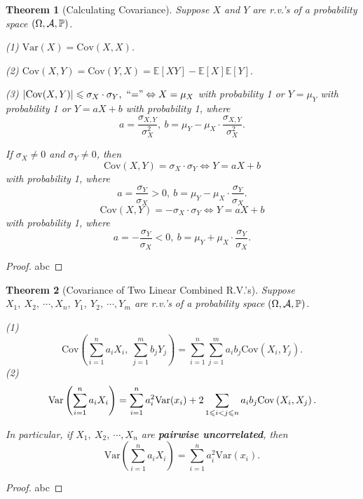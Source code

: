 \documentclass[openany,12pt]{book}
\newtheorem{theorem}{Theorem}[chapter]
\begin{document}
\begin{theorem}[Calculating Covariance]
Suppose $X$ and $Y$ are r.v.'s of a probability space $(\Omega,\mathcal{A},\mathbb{P})$.

(1) $\mathrm{Var}(X) = \mathrm{Cov}(X,X)$.

(2)
$\mathrm{Cov}(X,Y) = \mathrm{Cov}(Y,X) = \mathbb{E}[XY] - \mathbb{E}[X] \mathbb{E}[Y].$

(3)
$\left| \mathrm{Cov}(X,Y) \right| \leqslant \sigma_{X}\cdot \sigma_{Y},\ \text{``=''} \Leftrightarrow X = \mu_{X}$ with probability 1 or
$Y = \mu_{Y}$ with probability 1 or $Y=aX+b$ with probability 1, where
\[a = \frac{\sigma_{X,Y}}{\sigma_{X}^{2}},\ b = \mu_{Y} - \mu_{X} \cdot \frac{\sigma_{X,Y}}{\sigma_{X}^{2}}.\]

If $\sigma_{X} \neq 0$ and $\sigma_{Y} \neq 0$, then
\[\mathrm{Cov}( X,Y)= \sigma_{X}\cdot \sigma_{Y} \Leftrightarrow Y = aX + b\]
with probability 1, where
\[a = \frac{\sigma_{Y}}{\sigma_{X}} > 0,\ b = \mu_{Y} - \mu_{X} \cdot \frac{\sigma_{Y}}{\sigma_{X}}.\]
\[\mathrm{Cov}( X,Y)=- \sigma_{X}\cdot \sigma_{Y} \Leftrightarrow Y = aX + b\]
with probability 1, where
\[a = - \frac{\sigma_{Y}}{\sigma_{X}} < 0,\ b = \mu_{Y} + \mu_{X} \cdot \frac{\sigma_{Y}}{\sigma_{X}}.\]
\end{theorem}

\begin{proof}
  abc
\end{proof}

\begin{theorem}[Covariance of Two Linear Combined R.V.'s]
Suppose $X_{1},\ X_{2},\ \cdots,X_{n},\ Y_{1},\ Y_{2},\ \cdots,Y_{m}$ are r.v.'s of a probability space $(\Omega,\mathcal{A},\mathbb{P})$.

(1)
\[\mathrm{Cov}\left( \sum_{i = 1}^{n}{a_{i}X_{i}},\ \sum_{j = 1}^{m}{b_{j}Y_{j}} \right) = \sum_{i = 1}^{n}{\sum_{j = 1}^{m}a_{i}b_{j}}\mathrm{Cov}\left( X_{i},Y_{j} \right).\]
(2)
\[\mathrm{Var}\left( \sum_{i = 1}^{n}{a_{i}X_{i}} \right) = \sum_{i = 1}^{n}{a_{i}^{2}\mathrm{Var}(x_{i})} + 2\sum_{1 \leqslant i < j \leqslant n}^{}a_{i}b_{j}\mathrm{Cov}\left( X_{i},X_{j} \right).\]

In particular, if $X_{1},\ X_{2},\ \cdots,X_{n}$ are \textbf{pairwise
uncorrelated}, then
\[\mathrm{Var}\left( \sum_{i = 1}^{n}{a_{i}X_{i}} \right) = \sum_{i = 1}^{n}{a_{i}^{2}\mathrm{Var}(x_{i})}.\]
\end{theorem}

\begin{proof}
  abc
\end{proof}
\end{document}
